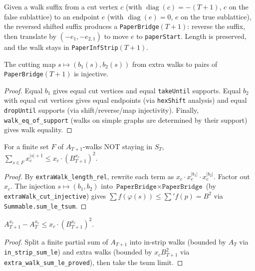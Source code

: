 \begin{definition}\label{def:mkSuffixBridge}
\leanok
  Given a walk suffix from a cut vertex $c$ (with $\operatorname{diag}(c) = -(T+1)$,
  $c$ on the false sublattice) to an endpoint $e$ (with $\operatorname{diag}(e)=0$,
  $e$ on the true sublattice), the reversed shifted suffix produces
  a \texttt{PaperBridge}$(T+1)$: reverse the suffix, then translate by
  $(-e_1, -e_{2,1})$ to move $e$ to \texttt{paperStart}.
  Length is preserved, and the walk stays in \texttt{PaperInfStrip}$(T+1)$.
\end{definition}

\begin{lemma}\label{lem:extraWalk_cut_injective}
\leanok
{}
  The cutting map $s \mapsto (b_1(s), b_2(s))$ from extra walks to
  pairs of \texttt{PaperBridge}$(T+1)$ is injective.
\end{lemma}
\begin{proof}
\leanok
  Equal $b_1$ gives equal cut vertices and equal \texttt{takeUntil} supports.
  Equal $b_2$ with equal cut vertices gives equal endpoints (via \texttt{hexShift}
  analysis) and equal \texttt{dropUntil} supports (via shift/reverse/map injectivity).
  Finally, \texttt{walk\_eq\_of\_support} (walks on simple graphs are determined by
  their support) gives walk equality.
\end{proof}

\begin{lemma}\label{lem:extra_walk_sum_le}
\leanok
{}
  For a finite set $F$ of $A_{T+1}$-walks NOT staying in $S_T$,
  $\sum_{s \in F} x_c^{|s|+1} \leq x_c \cdot (B_{T+1}^{x_c})^2$.
\end{lemma}
\begin{proof}
\leanok
  By \texttt{extraWalk\_length\_rel}, rewrite each term as
  $x_c \cdot x_c^{|b_1|} \cdot x_c^{|b_2|}$. Factor out $x_c$.
  The injection $s \mapsto (b_1, b_2)$ into $\texttt{PaperBridge} \times \texttt{PaperBridge}$
  (by \texttt{extraWalk\_cut\_injective}) gives
  $\sum f(\varphi(s)) \leq \sum' f(p) = B^2$
  via \texttt{Summable.sum\_le\_tsum}.
\end{proof}

\begin{lemma}\label{lem:cutting}
\leanok
{}
  $A_{T+1}^{x_c} - A_T^{x_c} \leq x_c \cdot (B_{T+1}^{x_c})^2$.
\end{lemma}
\begin{proof}
\leanok
  Split a finite partial sum of $A_{T+1}$ into in-strip walks
  (bounded by $A_T$ via \texttt{in\_strip\_sum\_le}) and extra walks
  (bounded by $x_c B_{T+1}^2$ via \texttt{extra\_walk\_sum\_le\_proved}),
  then take the tsum limit.
\end{proof}

